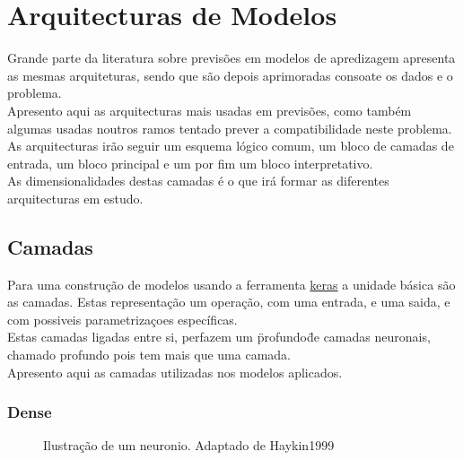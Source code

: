 \chapter{Arquitecturas de Modelos\label{ch:arquiteturas_modelos}}

Grande parte da literatura sobre previsões em modelos de apredizagem apresenta as mesmas arquiteturas, sendo que são depois aprimoradas consoate os dados e o problema. \\
Apresento aqui as arquitecturas mais usadas em previsões, como também algumas usadas noutros ramos tentado prever a compatibilidade neste problema. \\
As arquitecturas irão seguir um esquema lógico comum, um bloco de camadas de entrada, um bloco principal e um por fim um bloco interpretativo. \\
As dimensionalidades destas camadas é o que irá formar as diferentes arquitecturas em estudo. \\

\section{Camadas\label{se:layers}}

Para uma construção de modelos usando a ferramenta \href{https://keras.io/}{keras} a unidade básica são as camadas. Estas representação um operação, com uma entrada, e uma saida, e com possiveis parametrizaçoes específicas. \\
Estas camadas ligadas entre si, perfazem um \"profundo\" de camadas neuronais, chamado profundo pois tem mais  que uma camada. \\

Apresento aqui as camadas utilizadas nos modelos aplicados.\\

\subsection{Dense\label{se:dense_layer}}

\begin{figure}[H]
	\centering
	\resizebox{\linewidth}{!}{}
	\caption{Ilustração de um neuronio. Adaptado de Haykin1999\cite{Haykin1999}}
	\label{fig:neuronio}
\end{figure}


